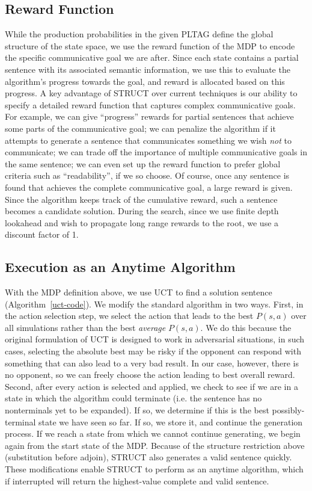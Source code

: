 \subsection{Reward Function}
 While the production probabilities in the given PLTAG define the
 global structure of the state space, we use the reward function of
 the MDP to encode the specific communicative goal we are after. Since
 each state contains a partial sentence with its associated semantic
 information, we use this to evaluate the algorithm's progress towards
 the goal, and reward is allocated based on this progress. A key
 advantage of STRUCT over current techniques is our ability to specify
 a detailed reward function that captures complex communicative goals.
 For example, we can give ``progress'' rewards for partial sentences
 that achieve some parts of the communicative goal; we can penalize
 the algorithm if it attempts to generate a sentence that communicates
 something we wish {\em not} to communicate; we can trade off the
 importance of multiple communicative goals in the same sentence; we
 can even set up the reward function to prefer global criteria such as
 ``readability'', if we so choose. Of course, once any sentence is
 found that achieves the complete communicative goal, a large reward
 is given. Since the algorithm keeps track of the cumulative reward,
 such a sentence becomes a candidate solution. During the search,
 since we use finite depth lookahead and wish to propagate long range
 rewards to the root, we use a discount factor of 1.

\subsection{Execution as an Anytime Algorithm}
 With the MDP definition above, we use UCT to find a solution sentence
 (Algorithm~\ref{uct-code}). We modify the standard algorithm in two
 ways. First, in the action selection step, we select the action that
 leads to the best $P(s,a)$ over all simulations rather than the best
 {\em average} $P(s,a)$. We do this because the original formulation
 of UCT is designed to work in adversarial situations, in such cases,
 selecting the absolute best may be risky if the opponent can respond
 with something that can also lead to a very bad result. In our case,
 however, there is no opponent, so we can freely choose the action
 leading to best overall reward. Second, after every action is
 selected and applied, we check to see if we are in a state in which
 the algorithm could terminate (i.e. the sentence has no nonterminals
 yet to be expanded).  If so, we determine if this is the best
 possibly-terminal state we have seen so far.  If so, we store it, and
 continue the generation process. If we reach a state from which we
 cannot continue generating, we begin again from the start state of
 the MDP. Because of the structure restriction above (substitution
 before adjoin), STRUCT also generates a valid sentence quickly. These
 modifications enable STRUCT to perform as an anytime algorithm, which
 if interrupted will return the highest-value complete and valid
 sentence.

